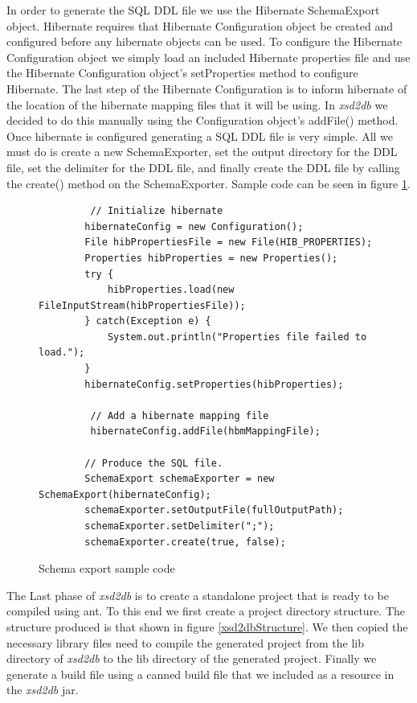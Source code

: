 In order to generate the SQL DDL file we use the Hibernate SchemaExport object.  Hibernate requires that Hibernate Configuration object be created and configured before any hibernate objects can be used.  To configure the Hibernate Configuration object we simply load an included Hibernate properties file and use the Hibernate Configuration object's setProperties method to configure Hibernate.  The last step of the Hibernate Configuration is to inform hibernate of the location of the hibernate mapping files that it will be using.  In \emph{xsd2db} we decided to do this manually using the Configuration object's addFile() method.   Once hibernate is configured generating a SQL DDL file is very simple.  All we must do is create a new SchemaExporter, set the output directory for the DDL file, set the delimiter for the DDL file, and finally create the DDL file by calling the create() method on the SchemaExporter.  Sample code can be seen in figure \ref{schemaExportSampleCode}.
\begin{figure}[htbp]
\begin{center}
\begin{verbatim}
         // Initialize hibernate
        hibernateConfig = new Configuration();
        File hibPropertiesFile = new File(HIB_PROPERTIES);
        Properties hibProperties = new Properties();
        try {
            hibProperties.load(new FileInputStream(hibPropertiesFile));
        } catch(Exception e) {
            System.out.println("Properties file failed to load.");
        }
        hibernateConfig.setProperties(hibProperties);

         // Add a hibernate mapping file
         hibernateConfig.addFile(hbmMappingFile);
         
        // Produce the SQL file.
        SchemaExport schemaExporter = new SchemaExport(hibernateConfig);
        schemaExporter.setOutputFile(fullOutputPath);
        schemaExporter.setDelimiter(";");
        schemaExporter.create(true, false);
\end{verbatim}
\caption{Schema export sample code}
\label{schemaExportSampleCode}
\end{center}
\end{figure}

The Last phase of \emph{xsd2db} is to create a standalone project that is ready to be compiled using ant.  To this end we first create a project directory structure. The structure produced is that shown in figure \ref{xsd2dbStructure}.  We then copied the necessary library files need to compile the generated project from the lib directory of \emph{xsd2db} to the lib directory of the generated project.  Finally we generate a build file using a canned build file that we included as a resource in the \emph{xsd2db} jar.   

